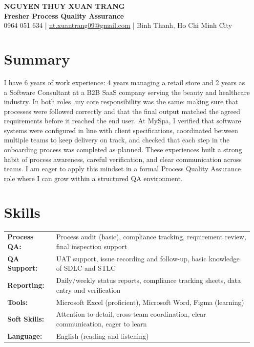 \documentclass[a4paper,11pt]{article}
\begin{document}
\begin{center}
  {\Huge\textbf{NGUYEN THUY XUAN TRANG}} \\[8pt]
  {\large\textbf{Fresher Process Quality Assurance}} \\[6pt]
  \small
  0964 051 634 \quad|\quad
  \href{mailto:nt.xuantrang09@gmail.com}{nt.xuantrang09@gmail.com} \quad|\quad
  Binh Thanh, Ho Chi Minh City \\[2pt]
\end{center}

\section{Summary}
I have 6 years of work experience: 4 years managing a retail store and 2 years as a Software Consultant at a B2B SaaS company serving the beauty and healthcare industry. In both roles, my core responsibility was the same: making sure that processes were followed correctly and that the final output matched the agreed requirements before it reached the end user. At MySpa, I verified that software systems were configured in line with client specifications, coordinated between multiple teams to keep delivery on track, and checked that each step in the onboarding process was completed as planned. These experiences built a strong habit of process awareness, careful verification, and clear communication across teams. I am eager to apply this mindset in a formal Process Quality Assurance role where I can grow within a structured QA environment.

\section{Skills}
\begin{tabularx}{\textwidth}{@{}l X@{}}
  \textbf{Process QA:}  & Process audit (basic), compliance tracking, requirement review, final inspection support \\
  \textbf{QA Support:}  & UAT support, issue recording and follow-up, basic knowledge of SDLC and STLC \\
  \textbf{Reporting:}   & Daily/weekly status reports, compliance tracking sheets, data entry and verification \\
  \textbf{Tools:}       & Microsoft Excel (proficient), Microsoft Word, Figma (learning) \\
  \textbf{Soft Skills:} & Attention to detail, cross-team coordination, clear communication, eager to learn \\
  \textbf{Language:}    & English (reading and listening) \\
\end{tabularx}
\end{document}

